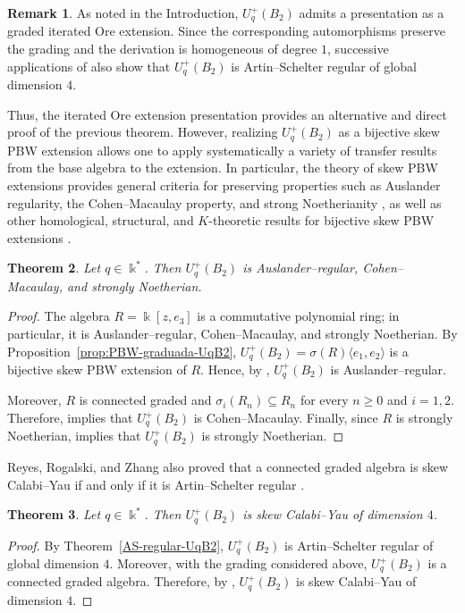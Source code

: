 \documentclass[11pt]{article}
\newtheorem{theorem}{Theorem}[section]
\theoremstyle{definition}
\newtheorem{remark}[theorem]{Remark}
\newcommand{\K}{\Bbbk}
\begin{document}
\begin{remark}
As noted in the Introduction, \(U_q^{+}(B_2)\) admits a presentation as
a graded iterated Ore extension. Since the corresponding automorphisms
preserve the grading and the derivation is homogeneous of degree \(1\),
successive applications of
\cite[Proposition~2]{ArtinSchelterTate1991Quantum} also show that
\(U_q^{+}(B_2)\) is Artin--Schelter regular of global dimension \(4\).

\noindent Thus, the iterated Ore extension presentation provides an alternative
and direct proof of the previous theorem. However, realizing
\(U_q^{+}(B_2)\) as a bijective skew PBW extension allows one to apply
systematically a variety of transfer results from the base algebra to the
extension. In particular, the theory of skew PBW extensions provides
general criteria for preserving properties such as Auslander regularity,
the Cohen--Macaulay property, and strong Noetherianity
\cite{LezamaVenegas2017Homological}, as well as other homological,
structural, and \(K\)-theoretic results for bijective skew PBW extensions
\cite{LezamaReyes2014Homological}.
\end{remark}




\begin{theorem}
\label{teo:UqB2-Auslander-CM}
Let \(q\in\K^*\). Then \(U_q^{+}(B_2)\) is Auslander--regular, Cohen--Macaulay, and strongly Noetherian.
\end{theorem}


\begin{proof}
The algebra \(R=\K[z,e_3]\) is a commutative polynomial ring; in
particular, it is Auslander--regular, Cohen--Macaulay, and strongly
Noetherian. By Proposition~\ref{prop:PBW-graduada-UqB2},
\(U_q^{+}(B_2)=\sigma(R)\langle e_1,e_2\rangle\) is a bijective skew PBW
extension of \(R\). Hence, by
\cite[Theorem~2.9]{LezamaVenegas2017Homological},
\(U_q^{+}(B_2)\) is Auslander--regular.

Moreover, \(R\) is connected graded and
\(\sigma_i(R_n)\subseteq R_n\) for every \(n\geq0\) and \(i=1,2\).
Therefore, \cite[Theorem~3.9]{LezamaVenegas2017Homological} implies that
\(U_q^{+}(B_2)\) is Cohen--Macaulay. Finally, since \(R\) is strongly
Noetherian, \cite[Theorem~4.3]{LezamaVenegas2017Homological} implies that
\(U_q^{+}(B_2)\) is strongly Noetherian.
\end{proof}

Reyes, Rogalski, and
Zhang also proved that a connected graded algebra is skew
Calabi--Yau if and only if it is Artin--Schelter regular
\cite[Lemma~1.2]{ReyesRogalskiZhang2014}.
\begin{theorem}
\label{teo:UqB2-skew-CY}
Let \(q\in\K^*\). Then \(U_q^{+}(B_2)\) is skew Calabi--Yau
of dimension \(4\).
\end{theorem}
\begin{proof}
By Theorem~\ref{AS-regular-UqB2},
\(U_q^{+}(B_2)\) is Artin--Schelter regular of global dimension \(4\).
Moreover, with the grading considered above,
\(U_q^{+}(B_2)\) is a connected graded algebra. Therefore, by
\cite[Lemma~1.2]{ReyesRogalskiZhang2014},
\(U_q^{+}(B_2)\) is skew Calabi--Yau of dimension \(4\).
\end{proof}
\end{document}
